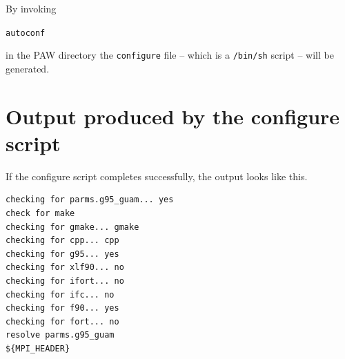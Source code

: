 \documentclass[a4paper,10pt]{report}
\newcommand{\mytt}[1]{{\tt #1}}
\begin{document}
By invoking
\begin{center}
\mytt{autoconf}
\end{center}
in the PAW directory the \texttt{configure} file -- which is a
\texttt{/bin/sh} script -- will be generated.


\appendix
\newpage
\chapter{Output produced by the configure script}
\label{sec:printoutconfigure}
If the configure script completes successfully, the output looks like this.
\begin{verbatim}
checking for parms.g95_guam... yes
check for make
checking for gmake... gmake
checking for cpp... cpp
checking for g95... yes
checking for xlf90... no
checking for ifort... no
checking for ifc... no
checking for f90... yes
checking for fort... no
resolve parms.g95_guam
${MPI_HEADER}


\end{verbatim}
\end{document}
